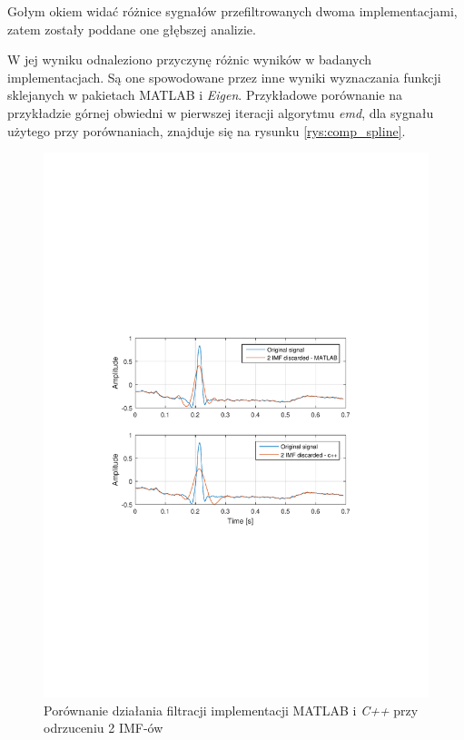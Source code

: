 Gołym okiem widać różnice sygnałów przefiltrowanych dwoma implementacjami, zatem
zostały poddane one głębszej analizie.

W jej wyniku odnaleziono przyczynę różnic
wyników w badanych implementacjach. Są one spowodowane przez inne wyniki
wyznaczania funkcji sklejanych w pakietach \textrm{MATLAB} i \textit{Eigen}.
Przykładowe porównanie na przykładzie górnej obwiedni w pierwszej iteracji
algorytmu \textit{emd}, dla sygnału użytego przy porównaniach, znajduje się na
rysunku \ref{rys:comp_spline}.

\newpage

\begin{figure}[!htb]
    \begin{center}
        \includegraphics[width=13cm,trim=4cm 9.5cm 4cm 10cm,clip]
        {../img/mat_cpp_domp_d2.pdf}
    \end{center}
    \caption{Porównanie działania filtracji implementacji \textrm{MATLAB} i
    \textit{C++} przy odrzuceniu 2 IMF-ów}
    \label{rys:comp_d2}
\end{figure}

